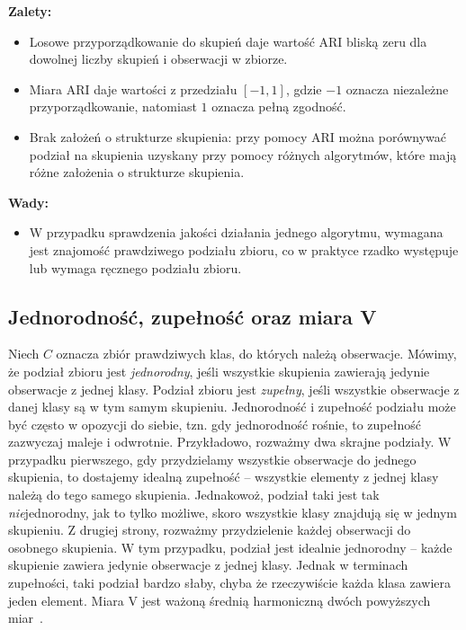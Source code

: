 \documentclass{praca1}
\begin{document}
\textbf{Zalety:}
\begin{itemize}
\item Losowe przyporządkowanie do skupień daje wartość $\textrm{ARI}$ bliską zeru dla dowolnej liczby skupień i obserwacji w zbiorze.
\item Miara $\textrm{ARI}$ daje wartości z przedziału $[-1, 1]$, gdzie $-1$ oznacza niezależne przyporządkowanie, natomiast $1$ oznacza pełną zgodność.
\item Brak założeń o strukturze skupienia: przy pomocy $\textrm{ARI}$ można porównywać podział na skupienia uzyskany przy pomocy różnych algorytmów, które mają różne założenia o strukturze skupienia.
\end{itemize}

\textbf{Wady:}
\begin{itemize}
\item W przypadku sprawdzenia jakości działania jednego algorytmu, wymagana jest znajomość prawdziwego podziału zbioru, co w praktyce rzadko występuje lub wymaga ręcznego podziału zbioru.
\end{itemize}

\subsection{Jednorodność, zupełność oraz miara V}

Niech $C$ oznacza zbiór prawdziwych klas, do których należą obserwacje. Mówimy, że podział zbioru jest \emph{jednorodny}, jeśli wszystkie skupienia zawierają jedynie obserwacje z jednej klasy. Podział zbioru jest \emph{zupełny}, jeśli wszystkie obserwacje z danej klasy są w tym samym skupieniu. Jednorodność i zupełność podziału może być często w opozycji do siebie, tzn. gdy jednorodność rośnie, to zupełność zazwyczaj maleje i odwrotnie. Przykładowo, rozważmy dwa skrajne podziały. W przypadku pierwszego, gdy przydzielamy wszystkie obserwacje do jednego skupienia, to dostajemy idealną zupełność -- wszystkie elementy z jednej klasy należą do tego samego skupienia. Jednakowoż, podział taki jest tak \emph{nie}jednorodny, jak to tylko możliwe, skoro wszystkie klasy znajdują się w jednym skupieniu. Z drugiej strony, rozważmy przydzielenie każdej obserwacji do osobnego skupienia. W tym przypadku, podział jest idealnie jednorodny -- każde skupienie zawiera jedynie obserwacje z jednej klasy. Jednak w terminach zupełności, taki podział bardzo słaby, chyba że rzeczywiście każda klasa zawiera jeden element. Miara $\textrm{V}$ jest ważoną średnią harmoniczną dwóch powyższych miar~\cite{Rosenberg2007:vmeasure}.
\end{document}
